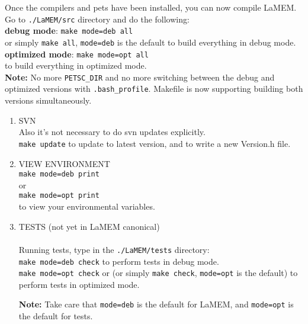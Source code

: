 \documentclass[a4paper,11pt]{article}
\begin{document}
Once the compilers and pets have been installed, you can now compile LaMEM. Go to \texttt{./LaMEM/src} directory and do the following:\\

\textbf{debug mode}: \indent \texttt{make mode=deb all}\\ 
or simply \texttt{make all}, \texttt{mode=deb} is the default to build everything in debug mode.\\

\textbf{optimized mode}: \indent \texttt{make mode=opt all}\\
to build everything in optimized mode.\\

\textbf{Note:} No more \texttt{PETSC\_DIR} and no more switching between the debug and optimized versions with \texttt{.bash\_profile}. Makefile is now supporting building both versions simultaneously.

\begin{enumerate}
\item SVN\\
Also it's not necessary to do svn updates explicitly.\\
\indent \texttt{make update} 
to update to latest version, and to write a new Version.h file.

\item VIEW ENVIRONMENT\\
\indent \texttt{make mode=deb print}\\
or \\
\indent \texttt{make mode=opt print} \\
to view your environmental variables.

\item TESTS (not yet in LaMEM canonical)\\
\\
Running tests, type in the \texttt{./LaMEM/tests} directory:\\
\indent \texttt{make mode=deb check} to perform tests in debug mode.\\
\indent \texttt{make mode=opt check} or (or simply \texttt{make check}, \texttt{mode=opt} is the default) to perform tests in optimized mode.

\textbf{Note:} Take care that \texttt{mode=deb} is the default for LaMEM, and \texttt{mode=opt} is the default for tests.
\end{enumerate}

\end{document}
